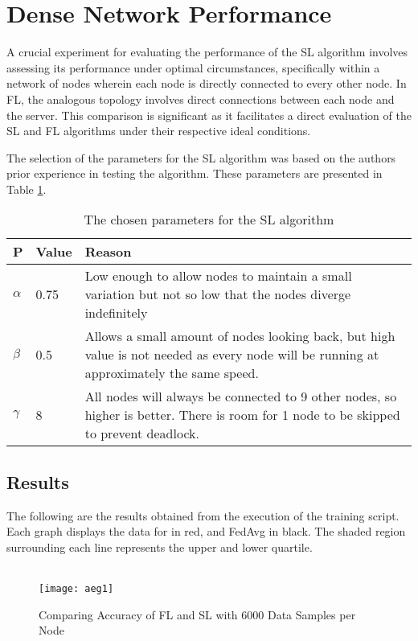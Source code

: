 \section{Dense Network Performance}
A crucial experiment for evaluating the performance of the SL algorithm involves assessing its performance under optimal circumstances, specifically within a network of nodes wherein each node is directly connected to every other node. In FL, the analogous topology involves direct connections between each node and the server. This comparison is significant as it facilitates a direct evaluation of the SL and FL algorithms under their respective ideal conditions.

The selection of the parameters for the SL algorithm was based on the authors prior experience in testing the algorithm. These parameters are presented in Table \ref{slparamsDNP}.
\begin{table}[H]
	\begin{tabular}{p{0.5cm}|l|p{11cm}}
		P & Value & Reason \\ \hline \hline
		$\alpha$  & 0.75  & Low enough to allow nodes to maintain a small variation but not so low that the nodes diverge indefinitely                               \\ \hline
		$\beta$   & 0.5   & Allows a small amount of nodes looking back, but high value is not needed as every node will be running at approximately the same speed. \\ \hline
		$\gamma$  & 8     & All nodes will always be connected to 9 other nodes, so higher is better. There is room for 1 node to be skipped to prevent deadlock.   
	\end{tabular}
	\caption{The chosen parameters for the SL algorithm} \label{slparamsDNP}
\end{table}

\subsection{Results}
The following are the results obtained from the execution of the training script. Each graph displays the data for \SL in red, and FedAvg in black. The shaded region surrounding each line represents the upper and lower quartile.

\begin{figure}[H] 
	 \\
	\texttt{[image: aeg1]}
	\caption{Comparing Accuracy of FL and SL with 6000 Data Samples per Node}
	\label{aeg1}
\end{figure}

